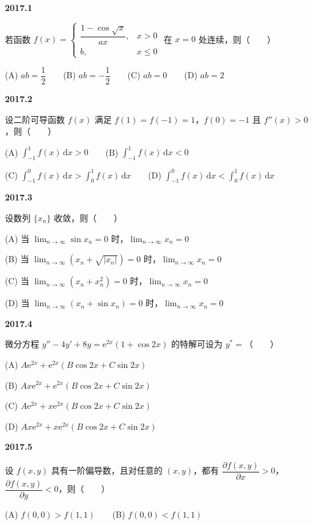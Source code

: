 \documentclass[UTF8,12pt,fontset=windows]{ctexart}
\begin{document}
{\large\bfseries 2017.1}

若函数 $f(x) = \begin{cases} \dfrac{1 - \cos\sqrt{x}}{ax}, & x > 0 \\ b, & x \leqslant 0 \end{cases}$ 在 $x = 0$ 处连续，则（　　）

(A) $ab = \dfrac{1}{2}$　　(B) $ab = -\dfrac{1}{2}$　　(C) $ab = 0$　　(D) $ab = 2$

\vfill
\newpage
{\large\bfseries 2017.2}

设二阶可导函数 $f(x)$ 满足 $f(1) = f(-1) = 1$，$f(0) = -1$ 且 $f''(x) > 0$，则（　　）

(A) $\int_{-1}^{1} f(x)\,\mathrm{d}x > 0$　　(B) $\int_{-1}^{1} f(x)\,\mathrm{d}x < 0$

(C) $\int_{-1}^{0} f(x)\,\mathrm{d}x > \int_{0}^{1} f(x)\,\mathrm{d}x$　　(D) $\int_{-1}^{0} f(x)\,\mathrm{d}x < \int_{0}^{1} f(x)\,\mathrm{d}x$

\vfill
\newpage
{\large\bfseries 2017.3}

设数列 $\{x_n\}$ 收敛，则（　　）

(A) 当 $\lim_{n\to\infty} \sin x_n = 0$ 时，$\lim_{n\to\infty} x_n = 0$

(B) 当 $\lim_{n\to\infty} \left(x_n + \sqrt{|x_n|}\right) = 0$ 时，$\lim_{n\to\infty} x_n = 0$

(C) 当 $\lim_{n\to\infty} \left(x_n + x_n^2\right) = 0$ 时，$\lim_{n\to\infty} x_n = 0$

(D) 当 $\lim_{n\to\infty} \left(x_n + \sin x_n\right) = 0$ 时，$\lim_{n\to\infty} x_n = 0$

\vfill
\newpage
{\large\bfseries 2017.4}

微分方程 $y'' - 4y' + 8y = \mathrm{e}^{2x}(1 + \cos 2x)$ 的特解可设为 $y^* =$（　　）

(A) $A\mathrm{e}^{2x} + \mathrm{e}^{2x}(B\cos 2x + C\sin 2x)$

(B) $Ax\mathrm{e}^{2x} + \mathrm{e}^{2x}(B\cos 2x + C\sin 2x)$

(C) $A\mathrm{e}^{2x} + x\mathrm{e}^{2x}(B\cos 2x + C\sin 2x)$

(D) $Ax\mathrm{e}^{2x} + x\mathrm{e}^{2x}(B\cos 2x + C\sin 2x)$

\vfill
\newpage
{\large\bfseries 2017.5}

设 $f(x,y)$ 具有一阶偏导数，且对任意的 $(x,y)$，都有 $\dfrac{\partial f(x,y)}{\partial x} > 0$，$\dfrac{\partial f(x,y)}{\partial y} < 0$，则（　　）

(A) $f(0,0) > f(1,1)$　　(B) $f(0,0) < f(1,1)$
\end{document}
